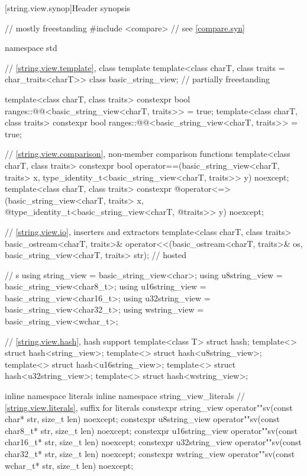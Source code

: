 [string.view.synop]{Header  synopsis}

%
\begin{codeblock}
// mostly freestanding
#include <compare>              // see \ref{compare.syn}

namespace std {
  // \ref{string.view.template}, class template 
  template<class charT, class traits = char_traits<charT>>
  class basic_string_view;                                              // partially freestanding

  template<class charT, class traits>
    constexpr bool ranges::@@<basic_string_view<charT, traits>> = true;
  template<class charT, class traits>
    constexpr bool ranges::@@<basic_string_view<charT, traits>> = true;

  // \ref{string.view.comparison}, non-member comparison functions
  template<class charT, class traits>
    constexpr bool operator==(basic_string_view<charT, traits> x,
                              type_identity_t<basic_string_view<charT, traits>> y) noexcept;
  template<class charT, class traits>
    constexpr @\seebelow@ operator<=>(basic_string_view<charT, traits> x,
              @\itcorr@                      type_identity_t<basic_string_view<charT,
              @\itcorr@                                      traits>> y) noexcept;

  // \ref{string.view.io}, inserters and extractors
  template<class charT, class traits>
    basic_ostream<charT, traits>&
      operator<<(basic_ostream<charT, traits>& os,
                 basic_string_view<charT, traits> str);                 // hosted

  //  s
  using string_view    = basic_string_view<char>;
  using u8string_view  = basic_string_view<char8_t>;
  using u16string_view = basic_string_view<char16_t>;
  using u32string_view = basic_string_view<char32_t>;
  using wstring_view   = basic_string_view<wchar_t>;

  // \ref{string.view.hash}, hash support
  template<class T> struct hash;
  template<> struct hash<string_view>;
  template<> struct hash<u8string_view>;
  template<> struct hash<u16string_view>;
  template<> struct hash<u32string_view>;
  template<> struct hash<wstring_view>;

  inline namespace literals {
    inline namespace string_view_literals {
      // \ref{string.view.literals}, suffix for  literals
      constexpr string_view    operator""sv(const char* str, size_t len) noexcept;
      constexpr u8string_view  operator""sv(const char8_t* str, size_t len) noexcept;
      constexpr u16string_view operator""sv(const char16_t* str, size_t len) noexcept;
      constexpr u32string_view operator""sv(const char32_t* str, size_t len) noexcept;
      constexpr wstring_view   operator""sv(const wchar_t* str, size_t len) noexcept;
    }
  }
}
\end{codeblock}

